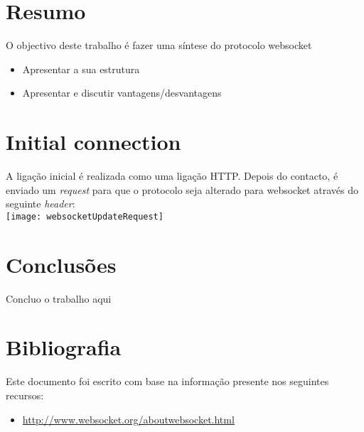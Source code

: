 \documentclass[a4paper]{article}
\begin{document}
\newpage
\setcounter{page}{1} %

\section{Resumo}

\textsf{O objectivo deste trabalho é fazer uma síntese do protocolo websocket}
\begin{itemize}
\item Apresentar a sua estrutura
\item Apresentar e discutir vantagens/desvantagens
\end{itemize}

\newpage

\section{Initial connection}
\textsf{A ligação inicial é realizada como uma ligação HTTP. Depois do contacto, é enviado um \emph{request} para que o protocolo seja alterado para websocket através do seguinte \emph{header}:}\\[0.5cm]

\texttt{[image: websocketUpdateRequest]}


\newpage
\section{Conclusões}

\textsf{Concluo o trabalho aqui}

\newpage

\section{Bibliografia}

\textsf{Este documento foi escrito com base na informação presente nos seguintes recursos:}
\begin{itemize}
\item \url{http://www.websocket.org/aboutwebsocket.html}
\end{itemize}
\end{document}
